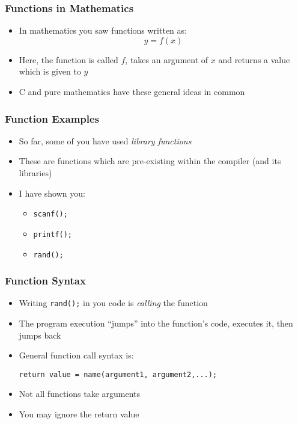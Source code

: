\documentclass[14pt]{beamer}
\begin{document}
\begin{frame}
\frametitle{Functions in Mathematics}
\begin{itemize}
\item In mathematics you saw functions written as:
\begin{equation*}
y = f(x)
\end{equation*}
\item Here, the function is called $f$, takes an argument of $x$ and returns a value which is given to $y$
\item C and pure mathematics have these general ideas in common
\end{itemize}
\end{frame}

\begin{frame}
\frametitle{Function Examples}
\begin{itemize}
\item So far, some of you have used \textit{library functions}
\item These are functions which are pre-existing within the compiler (and its libraries)
\item I have shown you:
	\begin{itemize}
		\item \texttt{scanf();}
		\item \texttt{printf();}
		\item \texttt{rand();}
	\end{itemize}
\end{itemize}
\end{frame}

\begin{frame}[fragile]
\frametitle{Function Syntax}
\begin{itemize}
\item Writing \texttt{rand();} in you code is \textit{calling} the function
\item The program execution ``jumps'' into the function's code, executes it, then jumps back
\item General function call syntax is:
\begin{lstlisting}[style=pseudo]
return value = name(argument1, argument2,...);
\end{lstlisting}
\item Not all functions take arguments
\item You may ignore the return value
\end{itemize}
\end{frame}
\end{document}
